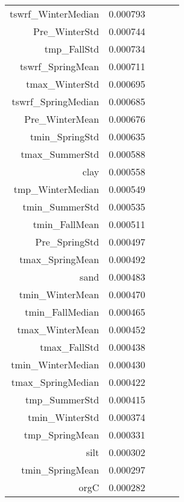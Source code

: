 \begin{tabular}{rrrrr}
tswrf_WinterMedian & 0.000793 \\
Pre_WinterStd & 0.000744 \\
tmp_FallStd & 0.000734 \\
tswrf_SpringMean & 0.000711 \\
tmax_WinterStd & 0.000695 \\
tswrf_SpringMedian & 0.000685 \\
Pre_WinterMean & 0.000676 \\
tmin_SpringStd & 0.000635 \\
tmax_SummerStd & 0.000588 \\
clay & 0.000558 \\
tmp_WinterMedian & 0.000549 \\
tmin_SummerStd & 0.000535 \\
tmin_FallMean & 0.000511 \\
Pre_SpringStd & 0.000497 \\
tmax_SpringMean & 0.000492 \\
sand & 0.000483 \\
tmin_WinterMean & 0.000470 \\
tmin_FallMedian & 0.000465 \\
tmax_WinterMean & 0.000452 \\
tmax_FallStd & 0.000438 \\
tmin_WinterMedian & 0.000430 \\
tmax_SpringMedian & 0.000422 \\
tmp_SummerStd & 0.000415 \\
tmin_WinterStd & 0.000374 \\
tmp_SpringMean & 0.000331 \\
silt & 0.000302 \\
tmin_SpringMean & 0.000297 \\
orgC & 0.000282 \\
\bottomrule
\end{tabular}
